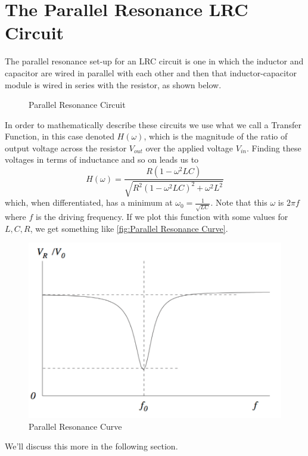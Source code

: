 \documentclass[12pt]{article}
\numberwithin{equation}{section}
\numberwithin{figure}{section}
\begin{document}
    \section{The Parallel Resonance LRC Circuit}\label{sec:Parallel Resonance}
    The parallel resonance set-up for an LRC circuit is one in which the inductor and capacitor are 
    wired in parallel with each other and then that inductor-capacitor module is wired in series with 
    the resistor, as shown below. 
    \begin{figure}[H]
        \centering
            \def\svgwidth{0.5\textwidth}
            
            \caption{Parallel Resonance Circuit}
            \label{fig:Parallel Resonance Circuit}
    \end{figure}
    In order to mathematically describe these circuits we use what we call a Transfer Function, in this 
    case denoted $H(\omega)$, which is the magnitude of the ratio of output voltage across the resistor 
    $V_{out}$ over the applied voltage $V_{in}$. Finding these voltages in terms of inductance and so 
    on leads us to 
    \begin{equation}
        H(\omega)=\frac{R(1-\omega^2LC)}{\sqrt{R^2(1-\omega^2LC)^2+\omega^2L^2}}
        \label{eqn:Parallel Transfer Function}
    \end{equation}
    which, when differentiated, has a minimum at $\omega_0=\frac{1}{\sqrt{LC}}$. Note that this $\omega$ 
    is $2\pi f$ where $f$ is the driving frequency. If we plot this function with some values for 
    $L,C,R$, we get something like \autoref{fig:Parallel Resonance Curve}.
    \begin{figure}[H]
        \begin{center}
           \includegraphics[width=.65\textwidth]{ParallelResonanceCurve.png}
           \caption{Parallel Resonance Curve}
           \label{fig:Parallel Resonance Curve}
        \end{center}
    \end{figure}
    We'll discuss this more in the following section.
\end{document}
